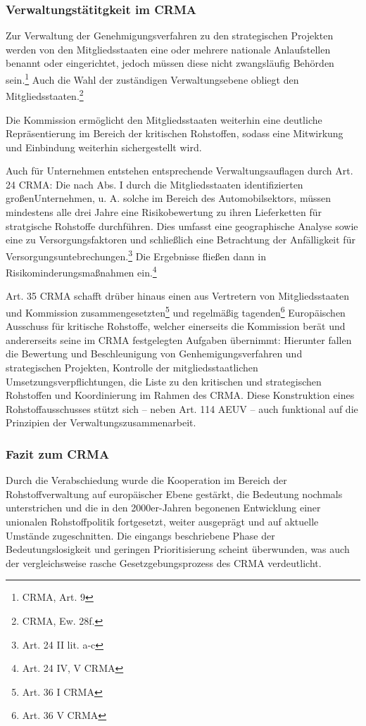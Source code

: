 \documentclass[12pt,a4paper,oneside]{book} %
\begin{document}
	\subsubsection{Verwaltungstätitgkeit im CRMA}
	
	Zur Verwaltung der Genehmigungsverfahren zu den strategischen Projekten werden von den Mitgliedsstaaten eine oder mehrere nationale Anlaufstellen benannt oder eingerichtet, jedoch müssen diese nicht zwangsläufig Behörden sein.\footnote{CRMA, Art. 9} Auch die Wahl der zuständigen Verwaltungsebene obliegt den Mitgliedsstaaten.\footnote{CRMA, Ew. 28f.}
	
	Die Kommission ermöglicht den Mitgliedsstaaten weiterhin eine deutliche Repräsentierung im Bereich der kritischen Rohstoffen, sodass eine Mitwirkung und Einbindung weiterhin sichergestellt wird.
	
	Auch für Unternehmen entstehen entsprechende Verwaltungsauflagen durch Art. 24 CRMA: Die nach Abs. I durch die Mitgliedsstaaten identifizierten \glqq großen\grqq Unternehmen, u. A. solche im Bereich des Automobilsektors, müssen mindestens alle drei Jahre eine Risikobewertung zu ihren Lieferketten für stratgische Rohstoffe durchführen. Dies umfasst eine geographische Analyse sowie eine zu Versorgungsfaktoren und schließlich eine Betrachtung der Anfälligkeit für Versorgungsuntebrechungen.\footnote{Art. 24 II lit. a-c} Die Ergebnisse fließen dann in Risikominderungsmaßnahmen ein.\footnote{Art. 24 IV, V CRMA}
	
	
	Art. 35 CRMA schafft drüber hinaus einen aus Vertretern von Mitgliedsstaaten und Kommission zusammengesetzten\footnote{Art. 36 I CRMA} und regelmäßig tagenden\footnote{Art. 36 V CRMA} Europäischen Ausschuss für kritische Rohstoffe, welcher einerseits die Kommission berät und andererseits seine im CRMA festgelegten Aufgaben übernimmt: Hierunter fallen die Bewertung und Beschleunigung von Genhemigungsverfahren und strategischen Projekten, Kontrolle der mitgliedsstaatlichen Umsetzungsverpflichtungen, die Liste zu den kritischen und strategischen Rohstoffen und Koordinierung im Rahmen des CRMA.
	Diese Konstruktion eines Rohstoffausschusses stützt sich – neben Art. 114 AEUV – auch funktional auf die Prinzipien der Verwaltungszusammenarbeit.
	
	\subsubsection{Fazit zum CRMA}
	Durch die Verabschiedung wurde die Kooperation im Bereich der Rohstoffverwaltung auf europäischer Ebene gestärkt, die Bedeutung nochmals unterstrichen und die in den 2000er-Jahren begonenen Entwicklung einer unionalen Rohstoffpolitik fortgesetzt, weiter ausgeprägt und auf aktuelle Umstände zugeschnitten. Die eingangs beschriebene Phase der Bedeutungslosigkeit und geringen Prioritisierung scheint überwunden, was auch der vergleichsweise rasche Gesetzgebungsprozess des CRMA verdeutlicht.
	
\end{document}
